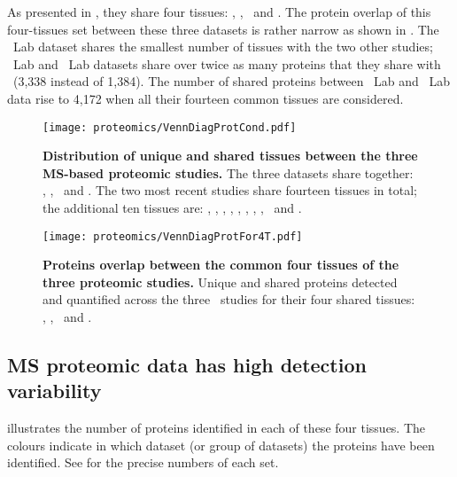 As presented in ,
they share four tissues: \heart, \lung, \ovary\ and \pancreas.
The protein overlap of this four-tissues set between these three datasets
is rather narrow as shown in .
The \cutler\ Lab dataset shares
the smallest number of tissues with the two other studies;
\pandey\ Lab and \kuster\ Lab datasets share over twice as many proteins
that they share with \cutler\ (3,338 instead of 1,384).
The number of shared proteins between \pandey\ Lab and \kuster\ Lab data rise to 4,172
when all their fourteen common tissues are considered.\mybr\

\begin{figure}[!htb]
    \texttt{[image: proteomics/VennDiagProtCond.pdf]}\centering
    \vspace{-6mm}
    \caption[Distribution of unique shared tissues between
    the 3 MS-based proteomic studies]{\label{fig:VennDiagProt3}\textbf{Distribution
    of unique and shared tissues between the three MS-based proteomic studies.}
    The three datasets share together: \heart, \lung, \ovary\ and \pancreas.
    The two most recent studies share fourteen tissues in total;
    the additional ten tissues are: \adrenal, \hcolon, \gallbladder,
    \oesophagus, \kidney, \liver, \placenta, \prostate, \rectum\ and \testis.}
\end{figure}
\vspace{1.4cm}
\begin{figure}[!htb]
    \texttt{[image: proteomics/VennDiagProtFor4T.pdf]}\centering
    \vspace{-2mm}
    \caption[Proteins overlap between the common tissues of
    the 3 proteomic studies]{\label{fig:VennProtComm}\textbf{Proteins
    overlap between the common four tissues of the three proteomic studies.}
    Unique and shared proteins detected and quantified
    across the three \ms\ studies for their four shared tissues:
    \heart, \lung, \ovary\ and \pancreas.}
\end{figure}
\subsection{MS proteomic data has high detection variability}

illustrates the number of proteins identified in each of these four tissues.
The colours indicate in which dataset (or group of datasets)
the proteins have been identified.
See  for the precise numbers of each set.\mybr\

